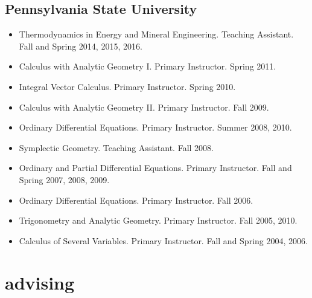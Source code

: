 \documentclass[11pt,article,oneside]{memoir}
\begin{document}
\subsection{Pennsylvania State University}
\begin{itemize}[label={}]

\item Thermodynamics in Energy and Mineral Engineering. Teaching Assistant. Fall and Spring 2014, 2015, 2016.

\item Calculus with Analytic Geometry I. Primary Instructor. Spring 2011.

\item Integral Vector Calculus. Primary Instructor. Spring 2010.

\item Calculus with Analytic Geometry II. Primary Instructor. Fall 2009.

\item Ordinary Differential Equations. Primary Instructor. Summer 2008, 2010.

\item Symplectic Geometry. Teaching Assistant. Fall 2008.

\item Ordinary and Partial Differential Equations. Primary Instructor. Fall and Spring 2007, 2008, 2009.

\item Ordinary Differential Equations. Primary Instructor. Fall 2006.

\item Trigonometry and Analytic Geometry. Primary Instructor. Fall 2005, 2010.

\item Calculus of Several Variables. Primary Instructor. Fall and Spring 2004, 2006.

\end{itemize}



\section{advising}

\mbox{}\vspace{-\dimexpr\baselineskip\relax}

\vspace{\baselineskip}
\end{document}
